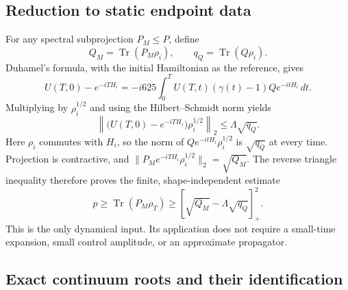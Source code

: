 \documentclass[aps,prl,reprint,superscriptaddress,longbibliography]{revtex4-2}
\begin{document}
\subsection{Reduction to static endpoint data}

For any spectral subprojection $P_M\le P$, define
\begin{equation}
 Q_M=\operatorname{Tr}(P_M\rho_i),\qquad
 q_Q=\operatorname{Tr}(Q\rho_i).
 \label{ce:static-data}
\end{equation}
Duhamel's formula, with the initial Hamiltonian as the reference, gives
\begin{equation}
 U(T,0)-e^{-iTH_i}
 =-i625\int_0^T U(T,t)(\gamma(t)-1)Qe^{-itH_i}\,dt.
 \label{ce:duhamel}
\end{equation}
Multiplying by $\rho_i^{1/2}$ and using the Hilbert--Schmidt norm yields
\begin{equation}
 \left\|\bigl(U(T,0)-e^{-iTH_i}\bigr)\rho_i^{1/2}\right\|_2
 \le\Lambda\sqrt{q_Q}.
 \label{ce:hs-bound}
\end{equation}
Here $\rho_i$ commutes with $H_i$, so the norm of
$Qe^{-itH_i}\rho_i^{1/2}$ is $\sqrt{q_Q}$ at every time. Projection is
contractive, and
$\|P_Me^{-iTH_i}\rho_i^{1/2}\|_2=\sqrt{Q_M}$. The reverse triangle inequality
therefore proves the finite, shape-independent estimate
\begin{equation}
 p\ge\operatorname{Tr}(P_M\rho_T)
 \ge \left[\sqrt{Q_M}-\Lambda\sqrt{q_Q}\right]_+^2.
 \label{ce:probability-bound}
\end{equation}
This is the only dynamical input. Its application does not require a
small-time expansion, small control amplitude, or an approximate
propagator.

\subsection{Exact continuum roots and their identification}
\end{document}
